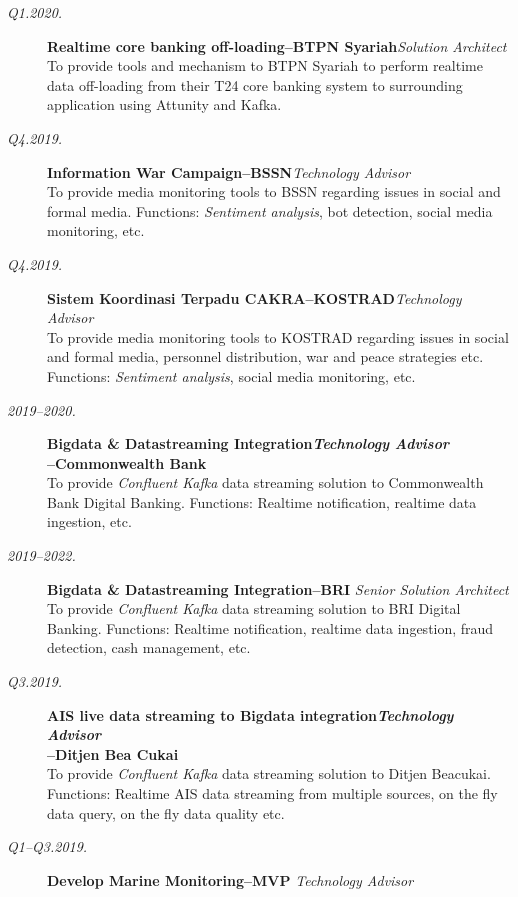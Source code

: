\documentclass[12pt]{res} %
\begin{document}
\begin{resume}
\vspace{10pt} 
\begin{description}
	\item[{\sl {\footnotesize Q1.2020}.}] {\bf Realtime core banking off-loading--BTPN Syariah}\hfill {\sl Solution Architect}\\
	To provide tools and mechanism to BTPN Syariah to perform realtime data off-loading from their T24 core banking system to surrounding application using Attunity and Kafka.
    \item[{\sl {\footnotesize Q4.2019}.}] {\bf Information War Campaign--BSSN}\hfill {\sl Technology Advisor}\\
    To provide media monitoring tools to BSSN regarding issues in social and formal media. Functions: {\sl Sentiment analysis}, bot detection,
    social media monitoring, etc.
    \item[{\sl {\footnotesize Q4.2019}.}] {\bf Sistem Koordinasi Terpadu CAKRA--KOSTRAD}\hfill {\sl Technology Advisor}\\
    To provide media monitoring tools to KOSTRAD regarding issues in social and formal media, personnel distribution, war and peace strategies etc.
    Functions: {\sl Sentiment analysis}, social media monitoring, etc.
    \item[{\sl {\footnotesize 2019--2020}.}] {\bf Bigdata \& Datastreaming Integration\hfill {\sl Technology Advisor}\\--Commonwealth Bank}\\
    To provide {\sl Confluent Kafka} data streaming solution to Commonwealth Bank Digital Banking. Functions: Realtime notification, realtime data ingestion, etc.
    \item[{\sl {\footnotesize 2019--2022}.}] {\bf Bigdata \& Datastreaming Integration--BRI} \hfill {\sl Senior Solution Architect}\\
    To provide {\sl Confluent Kafka} data streaming solution to BRI Digital Banking. Functions: Realtime notification, realtime data ingestion, fraud detection,
    cash management, etc.
    \item[{\sl {\footnotesize Q3.2019}.}] {\bf AIS live data streaming to Bigdata integration\hfill {\sl Technology Advisor}\\--Ditjen Bea Cukai}\\
    To provide {\sl Confluent Kafka} data streaming solution to Ditjen Beacukai. Functions: Realtime AIS data streaming from multiple sources, on the fly data query,
    on the fly data quality etc.
    \item[{\sl {\footnotesize Q1--Q3.2019}.}] {\bf Develop Marine Monitoring--MVP} \hfill {\sl Technology Advisor}\\

\end{description}
\end{resume}
\end{document}
